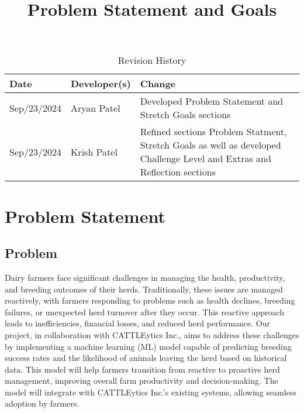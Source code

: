 \documentclass{article}
\title{Problem Statement and Goals\\\progname}
\author{\authname}
\date{}
\begin{document}
\maketitle

\begin{table}[hp]
\caption{Revision History} \label{TblRevisionHistory}
\begin{tabularx}{\textwidth}{llX}
\toprule
\textbf{Date} & \textbf{Developer(s)} & \textbf{Change}\\
\midrule
Sep/23/2024 & Aryan Patel & Developed Problem Statement and Stretch Goals 
sections\\
Sep/23/2024 & Krish Patel & Refined sections Problem Statment, Stretch Goals as 
well as developed Challenge Level and Extras and Reflection sections\\

\bottomrule
\end{tabularx}
\end{table}

\section{Problem Statement}

\subsection{Problem}

Dairy farmers face significant challenges in managing the health, productivity,
and breeding outcomes of their herds. Traditionally, these issues are managed 
reactively, with farmers responding to problems such as health declines, 
breeding failures, or unexpected herd turnover after they occur. This reactive 
approach leads to inefficiencies, financial losses, and reduced herd 
performance. Our project, in collaboration with CATTLEytics Inc., aims to 
address these challenges by implementing a machine learning (ML) model capable 
of predicting breeding success rates and the likelihood of animals leaving the 
herd based on historical data. This model will help farmers transition from 
reactive to proactive herd management, improving overall farm productivity and 
decision-making. The model will integrate with CATTLEytics Inc.'s existing 
systems, allowing seamless adoption by farmers.

\end{document}
